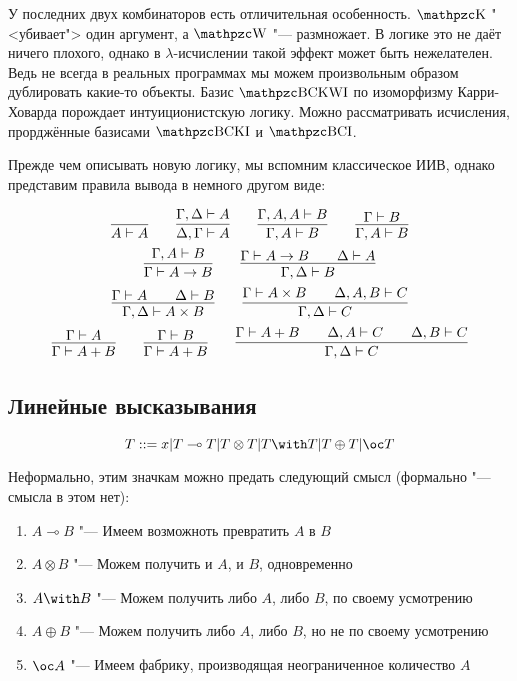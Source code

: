 У последних двух комбинаторов есть отличительная особенность. $\comb K$ "<убивает"> один аргумент, а $\comb W$ "--- размножает.
В логике это не даёт ничего плохого, однако в $\lambda$-исчислении такой эффект может быть нежелателен.
Ведь не всегда в реальных программах мы можем произвольным образом дублировать какие-то объекты.
Базис $\comb{BCKWI}$ по изоморфизму Карри-Ховарда порождает интуиционистскую логику.
Можно рассматривать исчисления, прорджённые базисами $\comb{BCKI}$ и $\comb{BCI}$.

Прежде чем описывать новую логику, мы вспомним классическое ИИВ, однако представим правила вывода в немного другом виде:
\begin{@empty} \inferspacing
\begin{gather*}
    \infer{A \vdash A}{} \qquad
    \infer{\Delta, \Gamma \vdash A}{\Gamma, \Delta \vdash A} \qquad
    \infer{\Gamma, A \vdash B}{\Gamma, A, A \vdash B} \qquad
    \infer{\Gamma, A \vdash B}{\Gamma \vdash B} \\
    \infer{\Gamma \vdash A \rightarrow B}{\Gamma, A \vdash B} \qquad
    \infer{\Gamma, \Delta \vdash B}{\Gamma \vdash A \rightarrow B && \Delta \vdash A} \\
    \infer{\Gamma, \Delta \vdash A \times B}{\Gamma \vdash A && \Delta \vdash B} \qquad
    \infer{\Gamma, \Delta \vdash C}{\Gamma \vdash A \times B && \Delta, A, B \vdash C}\\
    \infer{\Gamma \vdash A + B}{\Gamma \vdash A} \qquad
    \infer{\Gamma \vdash A + B}{\Gamma \vdash B} \qquad
    \infer{\Gamma, \Delta \vdash C}{\Gamma \vdash A + B && \Delta, A \vdash C && \Delta, B \vdash C}
\end{gather*}
\end{@empty}%

\subsection{\texorpdfstring{Линейные высказывания}{Linear statements}}
\begin{definition}
    \begin{bnf}
    \[
        T ::= x | T \multimap T | T \otimes T | T \with T | T \oplus T | \oc T
    \]
    \end{bnf}
\end{definition}
Неформально, этим значкам можно предать следующий смысл (формально "--- смысла в этом нет):
\begin{enumerate}
	\item $A \multimap B$  "--- Имеем возможноть превратить $A$ в $B$
	\item $A \otimes B$ "--- Можем получить и $A$, и $B$, одновременно
	\item $A \with B$ "--- Можем получить либо $A$, либо $B$, по своему усмотрению
	\item $A \oplus B$ "--- Можем получить либо $A$, либо $B$, но не по своему усмотрению
	\item $\oc A$ "--- Имеем фабрику, производящая  неограниченное количество $A$
\end{enumerate}

